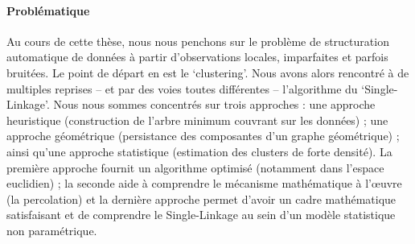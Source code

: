 \begin{AbstractPage}

\small

\begin{resume}

\paragraph{Problématique}
Au cours de cette thèse, nous nous penchons sur le problème de structuration automatique de données à partir d'observations locales, imparfaites et parfois bruitées. 
Le point de départ en est le `clustering'. %
Nous avons alors rencontré à de multiples reprises -- et par des voies toutes différentes -- l'algorithme du `Single-Linkage'.
Nous nous sommes concentrés sur trois approches %
: une approche heuristique (construction de l'arbre minimum couvrant sur les données) ; une approche géométrique (persistance des composantes d'un graphe géométrique) ; ainsi qu'une approche statistique (estimation des clusters de forte densité).
La première approche  fournit un algorithme optimisé (notamment dans l'espace euclidien) ; la seconde aide à comprendre le mécanisme mathématique à l'œuvre (la percolation) et la dernière approche permet d'avoir un cadre mathématique satisfaisant et de comprendre le Single-Linkage au sein d'un modèle statistique non paramétrique.



\end{resume}
\end{AbstractPage}
